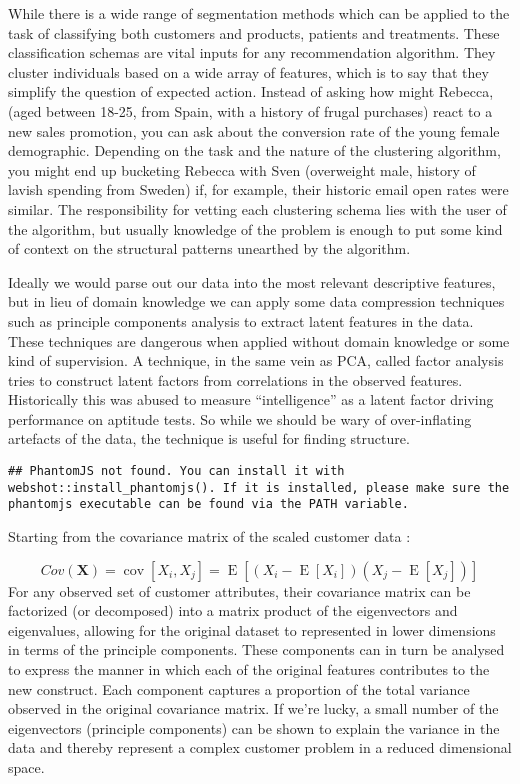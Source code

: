 \documentclass[]{tufte-book}
\theoremstyle{definition}
\theoremstyle{definition}
\theoremstyle{definition}
\theoremstyle{remark}
\begin{document}
While there is a wide range of segmentation methods which can be applied to the task of classifying both customers and products, patients and treatments. These classification schemas are vital inputs for any recommendation algorithm. They cluster individuals based on a wide array of features, which is to say that they simplify the question of expected action. Instead of asking how might Rebecca, (aged between 18-25, from Spain, with a history of frugal purchases) react to a new sales promotion, you can ask about the conversion rate of the young female demographic. Depending on the task and the nature of the clustering algorithm, you might end up bucketing Rebecca with Sven (overweight male, history of lavish spending from Sweden) if, for example, their historic email open rates were similar. The responsibility for vetting each clustering schema lies with the user of the algorithm, but usually knowledge of the problem is enough to put some kind of context on the structural patterns unearthed by the algorithm.

Ideally we would parse out our data into the most relevant descriptive features, but in lieu of domain knowledge we can apply some data compression techniques such as principle components analysis to extract latent features in the data. These techniques are dangerous when applied without domain knowledge or some kind of supervision. A technique, in the same vein as PCA, called factor analysis tries to construct latent factors from correlations in the observed features. Historically this was abused to measure ``intelligence'' as a latent factor driving performance on aptitude tests. So while we should be wary of over-inflating artefacts of the data, the technique is useful for finding structure.

\begin{verbatim}
## PhantomJS not found. You can install it with webshot::install_phantomjs(). If it is installed, please make sure the phantomjs executable can be found via the PATH variable.
\end{verbatim}

Starting from the covariance matrix of the scaled customer data :

\[ Cov(\mathbf{X}) = \operatorname{cov}[X_i, X_j] = \operatorname{E}[(X_i - \operatorname{E}[X_i])(X_j - \operatorname{E}[X_j])] \]
For any observed set of customer attributes, their covariance matrix can be factorized (or decomposed) into a matrix product of the eigenvectors and eigenvalues, allowing for the original dataset to represented in lower dimensions in terms of the principle components. These components can in turn be analysed to express the manner in which each of the original features contributes to the new construct. Each component captures a proportion of the total variance observed in the original covariance matrix. If we're lucky, a small number of the eigenvectors (principle components) can be shown to explain the variance in the data and thereby represent a complex customer problem in a reduced dimensional space.
\end{document}
